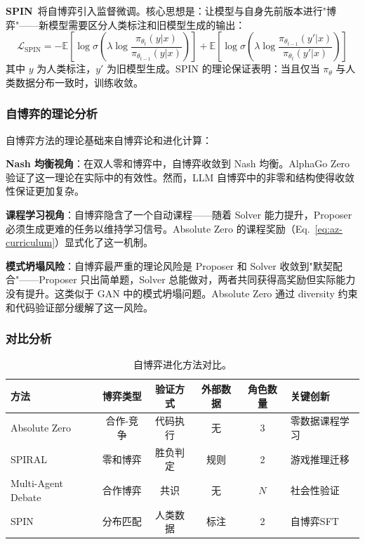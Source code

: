 \textbf{SPIN}~\citep{spin2024}将自博弈引入监督微调。核心思想是：让模型与自身先前版本进行"博弈"——新模型需要区分人类标注和旧模型生成的输出：
\begin{equation}
\mathcal{L}_{\mathrm{SPIN}} = -\mathbb{E}\left[\log \sigma\left(\lambda \log \frac{\pi_{\theta_t}(y|x)}{\pi_{\theta_{t-1}}(y|x)}\right)\right] + \mathbb{E}\left[\log \sigma\left(\lambda \log \frac{\pi_{\theta_{t-1}}(y'|x)}{\pi_{\theta_t}(y'|x)}\right)\right]
\label{eq:spin-loss}
\end{equation}
其中 $y$ 为人类标注，$y'$ 为旧模型生成。SPIN 的理论保证表明：当且仅当 $\pi_\theta$ 与人类数据分布一致时，训练收敛。

\subsubsection{自博弈的理论分析}

自博弈方法的理论基础来自博弈论和进化计算：

\textbf{Nash 均衡视角}：在双人零和博弈中，自博弈收敛到 Nash 均衡。AlphaGo Zero 验证了这一理论在实际中的有效性。然而，LLM 自博弈中的非零和结构使得收敛性保证更加复杂。

\textbf{课程学习视角}：自博弈隐含了一个自动课程——随着 Solver 能力提升，Proposer 必须生成更难的任务以维持学习信号。Absolute Zero 的课程奖励（Eq.~\ref{eq:az-curriculum}）显式化了这一机制。

\textbf{模式坍塌风险}：自博弈最严重的理论风险是 Proposer 和 Solver 收敛到"默契配合"——Proposer 只出简单题，Solver 总能做对，两者共同获得高奖励但实际能力没有提升。这类似于 GAN 中的模式坍塌问题。Absolute Zero 通过 diversity 约束和代码验证部分缓解了这一风险。

\subsubsection{对比分析}

\begin{table}[htbp]
\centering
\caption{自博弈进化方法对比。}
\label{tab:selfplay-compare}
\begin{tabular}{lccccp{40mm}}
\toprule
\textbf{方法} & \textbf{博弈类型} & \textbf{验证方式} & \textbf{外部数据} & \textbf{角色数量} & \textbf{关键创新} \\
\midrule
Absolute Zero & 合作-竞争 & 代码执行 & 无 & 3 & 零数据课程学习 \\
SPIRAL & 零和博弈 & 胜负判定 & 规则 & 2 & 游戏推理迁移 \\
Multi-Agent Debate & 合作博弈 & 共识 & 无 & $N$ & 社会性验证 \\
SPIN & 分布匹配 & 人类数据 & 标注 & 2 & 自博弈SFT \\
\bottomrule
\end{tabular}
\end{table}

